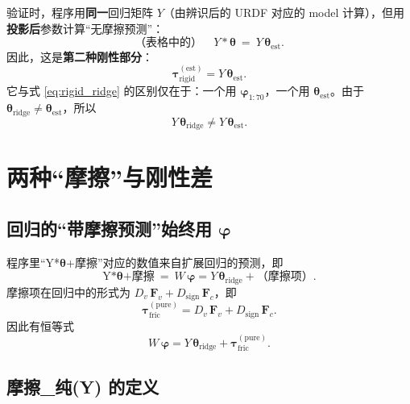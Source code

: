 \documentclass[12pt,a4paper]{article}
\begin{document}
验证时，程序用\textbf{同一}回归矩阵 $Y$（由辨识后的 URDF 对应的 model 计算），但用\textbf{投影后}参数计算``无摩擦预测''：
\begin{equation}
  \text{（表格中的）}\quad Y\!\ast\!\bm{\theta} \ =\ Y\,\bm{\theta}_{\mathrm{est}}.
  \label{eq:Y_theta_display}
\end{equation}
因此，这是\textbf{第二种刚性部分}：
\begin{equation}
  \boxed{\ \bm{\tau}_{\mathrm{rigid}}^{(\mathrm{est})} = Y\,\bm{\theta}_{\mathrm{est}}.\ }
  \label{eq:rigid_est}
\end{equation}
它与式 \eqref{eq:rigid_ridge} 的区别仅在于：一个用 $\bm{\varphi}_{1:70}$，一个用 $\bm{\theta}_{\mathrm{est}}$。由于 $\bm{\theta}_{\mathrm{ridge}}\neq\bm{\theta}_{\mathrm{est}}$，所以
\[
Y\,\bm{\theta}_{\mathrm{ridge}} \neq Y\,\bm{\theta}_{\mathrm{est}}.
\]

\section{两种``摩擦''与刚性差}

\subsection{回归的``带摩擦预测''始终用 \texorpdfstring{$\bm{\varphi}$}{φ}}

程序里``Y*$\bm{\theta}$+摩擦''对应的数值来自扩展回归的预测，即
\begin{equation}
  \text{Y*}\bm{\theta}\text{+摩擦} \ =\ W\,\bm{\varphi} = Y\,\bm{\theta}_{\mathrm{ridge}} + \text{（摩擦项）}.
  \label{eq:Y_theta_plus_fric}
\end{equation}
摩擦项在回归中的形式为 $D_v\,\bm{F}_v + D_{\mathrm{sign}}\,\bm{F}_c$，即
\begin{equation}
  \bm{\tau}_{\mathrm{fric}}^{(\mathrm{pure})} = D_v\,\bm{F}_v + D_{\mathrm{sign}}\,\bm{F}_c.
  \label{eq:fric_pure}
\end{equation}
因此有恒等式
\begin{equation}
  W\,\bm{\varphi} = Y\,\bm{\theta}_{\mathrm{ridge}} + \bm{\tau}_{\mathrm{fric}}^{(\mathrm{pure})}.
  \label{eq:W_phi_decomp}
\end{equation}

\subsection{摩擦\_纯(Y) 的定义}
\end{document}
